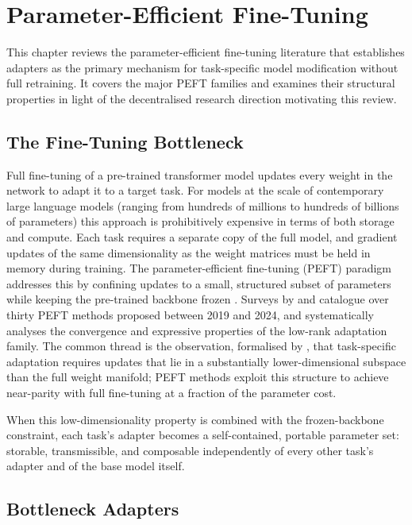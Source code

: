 \section{Parameter-Efficient Fine-Tuning}
\label{sec:peft}

This chapter reviews the parameter-efficient fine-tuning literature that
establishes adapters as the primary mechanism for task-specific model
modification without full retraining. It covers the major PEFT families
and examines their structural properties in light of the decentralised
research direction motivating this review.

\subsection{The Fine-Tuning Bottleneck}
\label{sec:peft:intro}

Full fine-tuning of a pre-trained transformer model updates every weight in the network
to adapt it to a target task. For models at the scale of contemporary large language models (ranging from hundreds of millions to hundreds of billions of parameters)
this approach is prohibitively expensive in terms of both storage and compute. Each
task requires a separate copy of the full model, and gradient updates of the same
dimensionality as the weight matrices must be held in memory during training. The
parameter-efficient fine-tuning (PEFT) paradigm addresses this by confining updates to a
small, structured subset of parameters while keeping the pre-trained backbone frozen
\citep{DingNature2023}. Surveys by \citet{Han2024} and \citet{WangAIReview2024}
catalogue over thirty PEFT methods proposed between 2019 and 2024, and \citet{MaoLoraSurvey2024}
systematically analyses the convergence and expressive properties of the low-rank
adaptation family. The common thread is the observation, formalised by \citet{ZengExpressive2024},
that task-specific adaptation requires updates that lie in a substantially lower-dimensional
subspace than the full weight manifold; PEFT methods exploit this structure to achieve
near-parity with full fine-tuning at a fraction of the parameter cost.

When this low-dimensionality property is combined with the frozen-backbone constraint,
each task's adapter becomes a self-contained, portable parameter set: storable, transmissible,
and composable independently of every other task's adapter and of the base model itself.

\subsection{Bottleneck Adapters}
\label{sec:peft:bottleneck}


